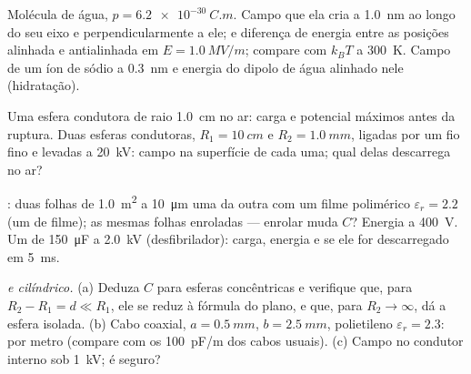 \begin{exercise}[$\star\star$]\label{exo:b1:potential-capacitors:7}
Molécula de água, $p = \qty{6.2e-30}{C.m}$. Campo que ela cria a \qty{1.0}{nm}
ao longo do seu eixo e perpendicularmente a ele;  e diferença de energia
entre as posições alinhada e antialinhada em $E = \qty{1.0}{MV/m}$;
compare com $k_BT$ a \qty{300}{K}. Campo de um íon de sódio a
\qty{0.3}{nm} e energia do dipolo de água alinhado nele (hidratação).
\end{exercise}

\begin{exercise}[$\star\star$]\label{exo:b1:potential-capacitors:8}
Uma esfera condutora de raio \qty{1.0}{cm} no ar: carga e potencial
máximos antes da ruptura. Duas esferas condutoras, $R_1 = \qty{10}{cm}$
e $R_2 = \qty{1.0}{mm}$, ligadas por um fio fino e levadas a
\qty{20}{kV}: campo na superfície de cada uma; qual delas descarrega no ar?
\end{exercise}

\begin{exercise}[$\star\star$]\label{exo:b1:potential-capacitors:9}
: duas folhas de \qty{1.0}{m^2} a \qty{10}{\micro m} uma da outra com um
filme polimérico $\varepsilon_r = 2.2$ (um  de filme); as mesmas folhas enroladas
--- enrolar muda $C$? Energia a \qty{400}{V}. Um  de \qty{150}{\micro F}
a \qty{2.0}{kV} (desfibrilador): carga, energia e  se ele for
descarregado em \qty{5}{ms}.
\end{exercise}

\begin{exercise}[$\star\star\star$]\label{exo:b1:potential-capacitors:10}
\emph{ e cilíndrico.} (a) Deduza $C$ para
esferas concêntricas e verifique que, para $R_2 - R_1 = d \ll R_1$, ele se reduz
à fórmula do plano, e que, para $R_2 \to \infty$, dá a esfera isolada.
(b) Cabo coaxial, $a = \qty{0.5}{mm}$, $b = \qty{2.5}{mm}$, polietileno
$\varepsilon_r = 2.3$:  por metro (compare com os \qty{100}{pF/m}
dos cabos usuais). (c) Campo no condutor interno sob
\qty{1}{kV}; é seguro?
\end{exercise}

